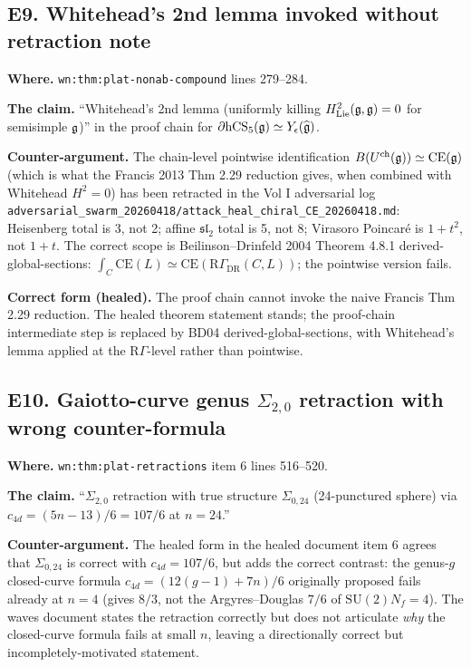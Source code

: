 \subsection*{E9. Whitehead's 2nd lemma invoked without retraction note}
\label{wn:subsec:E9-whitehead-2nd-lemma}

\textbf{Where.} \verb|wn:thm:plat-nonab-compound| lines 279--284.

\textbf{The claim.} ``Whitehead's 2nd lemma (uniformly killing
$H^2_{\mathrm{Lie}}(\mathfrak{g}, \mathfrak{g}) = 0$ for semisimple $\mathfrak{g}$)'' in the proof
chain for $\partial \mathrm{hCS}_5(\mathfrak{g}) \simeq Y_{\epsilon}(\widehat {\mathfrak{g}})$.

\textbf{Counter-argument.} The chain-level pointwise identification
$B(U^{\mathrm{ch}}(\mathfrak{g})) \simeq \mathrm{CE}(\mathfrak{g})$ (which is what the
Francis 2013 Thm 2.29 reduction gives, when combined with Whitehead
$H^2 = 0$) has been retracted in the Vol I adversarial log
\verb|adversarial_swarm_20260418/attack_heal_chiral_CE_20260418.md|:
Heisenberg total is 3, not 2; affine $\mathfrak{sl}_2$ total is 5,
not 8; Virasoro Poincar\'e is $1 + t^2$, not $1 + t$. The correct scope
is Beilinson--Drinfeld 2004 Theorem 4.8.1 derived-global-sections:
$\int_C \mathrm{CE}(L) \simeq \mathrm{CE}(\mathrm R\Gamma_{\mathrm{DR}}(C, L))$;
the pointwise version fails.

\textbf{Correct form (healed).} The proof chain cannot invoke the naive
Francis Thm 2.29 reduction. The healed theorem statement stands; the
proof-chain intermediate step is replaced by BD04 derived-global-sections,
with Whitehead's lemma applied at the $\mathrm R\Gamma$-level rather
than pointwise.

\subsection*{E10. Gaiotto-curve genus $\Sigma_{2, 0}$ retraction with
wrong counter-formula}
\label{wn:subsec:E10-gaiotto-curve}

\textbf{Where.} \verb|wn:thm:plat-retractions| item 6 lines 516--520.

\textbf{The claim.} ``$\Sigma_{2, 0}$ retraction with true structure
$\Sigma_{0, 24}$ (24-punctured sphere) via $c_{4d} = (5n - 13)/6 = 107/6$
at $n = 24$.''

\textbf{Counter-argument.} The healed form in the healed document item 6
agrees that $\Sigma_{0, 24}$ is correct with $c_{4d} = 107/6$, but adds
the correct contrast: the genus-$g$ closed-curve formula
$c_{4d} = (12(g-1) + 7n)/6$ originally proposed fails already at
$n = 4$ (gives $8/3$, not the Argyres--Douglas $7/6$ of
$\mathrm{SU}(2) N_f = 4$). The waves document states the retraction
correctly but does not articulate \emph{why} the closed-curve formula
fails at small $n$, leaving a directionally correct but
incompletely-motivated statement.

